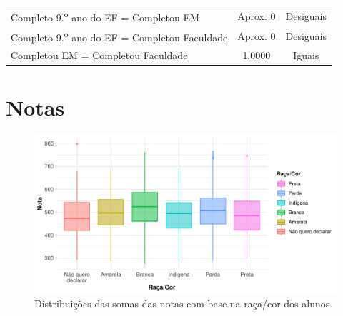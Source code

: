 \begin{table}[htb]
\begin{tabular}{lcc}
    Completo 9.\textsuperscript{o} ano do EF = Completou EM & Aprox. 0 & Desiguais\\
    Completo 9.\textsuperscript{o} ano do EF = Completou Faculdade & Aprox. 0 & Desiguais\\
    Completou EM = Completou Faculdade & 1.0000 & Iguais\\
    \bottomrule
    \end{tabular}
    \centering
\end{table}

\newpage
\section{Notas}


\newpage
\begin{figure}[h]
    \caption{Distribuições das somas das notas com base na raça/cor dos alunos.}
    \begin{center}
        \includegraphics[width=16cm]{img/raca_cor_notas.pdf}
    \end{center}
\end{figure}


